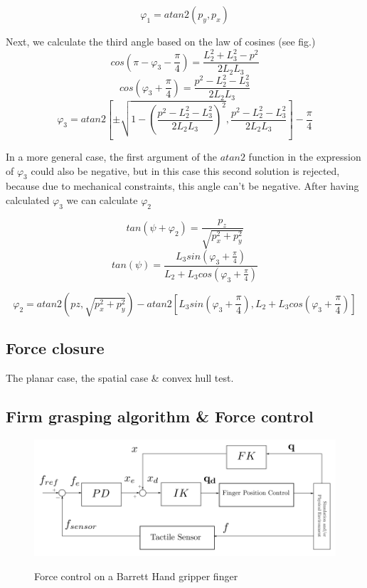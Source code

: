 \begin{equation}
φ_1 = atan2 \left( p_y, p_x \right)
\end{equation}

Next, we calculate the third angle based on the law of cosines (see fig.)
\[
cos \left( π - φ_3 - \frac{π}{4} \right) = \frac{L_2^2 + L_3^2 - p^2}{2 L_2 L_3}
\]
\[
cos \left(φ_3 + \frac{π}{4} \right) = \frac{p^2 - L_2^2 - L_3^2}{2 L_2 L_3}
\]
\begin{equation}
φ_3 = atan2 \left[ \pm \sqrt{1 - \left( \frac{p^2 - L_2^2 - L_3^2}{2 L_2 L_3} \right)^2} , \frac{p^2 - L_2^2 - L_3^2}{2 L_2 L_3} \right] - \frac{π}{4}
\end{equation}

In a more general case, the first argument of the $atan2$ function in the expression of $φ_3$ could also be negative,
but in this case this second solution is rejected, because due to mechanical constraints, this angle can't be negative. 
After having calculated $φ_3$ we can calculate $φ_2 $

\[
tan \left( ψ + φ_2 \right) = \frac{p_z}{\sqrt{p_x^2 + p_y^2}}
\]
\[
tan \left( ψ \right) = \frac{L_3 sin \left( φ_3 + \frac{π}{4} \right) }{L_2 + L_3 cos \left( φ_3 + \frac{π}{4} \right)}
\]

\begin{equation}
φ_2 = atan2 \left( pz, \sqrt{p_x^2 + p_y^2} \right) - atan2 \left[ L_3 sin \left( φ_3 + \frac{π}{4} \right), L_2 + L_3 cos \left( φ_3 + \frac{π}{4} \right) \right]
\end{equation}

\subsection{Force closure}
The planar case, the spatial case \& convex hull test.

\subsection{Firm grasping algorithm \& Force control}

\begin{center}
\begin{figure}[H]
\centering
\includegraphics[width=12cm]{images/finger-force-control.png}\\
\caption{Force control on a Barrett Hand gripper finger}
\end{figure}
\end{center}